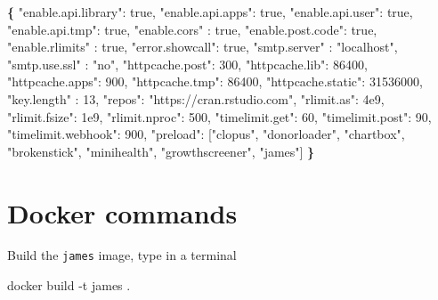 \documentclass[
]{book}
\newenvironment{Shaded}{\begin{snugshade}}{\end{snugshade}}
\newcommand{\AttributeTok}[1]{\textcolor[rgb]{0.77,0.63,0.00}{#1}}
\newcommand{\ExtensionTok}[1]{#1}
\newcommand{\KeywordTok}[1]{\textcolor[rgb]{0.13,0.29,0.53}{\textbf{#1}}}
\newcommand{\NormalTok}[1]{#1}
\newcommand{\StringTok}[1]{\textcolor[rgb]{0.31,0.60,0.02}{#1}}
\begin{document}
\begin{Shaded}
\begin{Highlighting}[]
\KeywordTok{\{}
    \StringTok{"enable.api.library"}\ExtensionTok{:}\NormalTok{ true,}
    \StringTok{"enable.api.apps"}\ExtensionTok{:}\NormalTok{ true,}
    \StringTok{"enable.api.user"}\ExtensionTok{:}\NormalTok{ true,}
    \StringTok{"enable.api.tmp"}\ExtensionTok{:}\NormalTok{ true,}
    \StringTok{"enable.cors"}\NormalTok{ : true,}
    \StringTok{"enable.post.code"}\ExtensionTok{:}\NormalTok{ true,}
    \StringTok{"enable.rlimits"}\NormalTok{ : true,}
    \StringTok{"error.showcall"}\ExtensionTok{:}\NormalTok{ true,}
    \StringTok{"smtp.server"}\NormalTok{ : }\StringTok{"localhost"}\NormalTok{,}
    \StringTok{"smtp.use.ssl"}\NormalTok{ : }\StringTok{"no"}\NormalTok{,}
    \StringTok{"httpcache.post"}\ExtensionTok{:}\NormalTok{ 300,}
    \StringTok{"httpcache.lib"}\ExtensionTok{:}\NormalTok{ 86400,}
    \StringTok{"httpcache.apps"}\ExtensionTok{:}\NormalTok{ 900,}
    \StringTok{"httpcache.tmp"}\ExtensionTok{:}\NormalTok{ 86400,}
    \StringTok{"httpcache.static"}\ExtensionTok{:}\NormalTok{ 31536000,}
    \StringTok{"key.length"}\NormalTok{ : 13,}
    \StringTok{"repos"}\ExtensionTok{:} \StringTok{"https://cran.rstudio.com"}\NormalTok{,}
    \StringTok{"rlimit.as"}\ExtensionTok{:}\NormalTok{ 4e9,}
    \StringTok{"rlimit.fsize"}\ExtensionTok{:}\NormalTok{ 1e9,}
    \StringTok{"rlimit.nproc"}\ExtensionTok{:}\NormalTok{ 500,}
    \StringTok{"timelimit.get"}\ExtensionTok{:}\NormalTok{ 60,}
    \StringTok{"timelimit.post"}\ExtensionTok{:}\NormalTok{ 90,}
    \StringTok{"timelimit.webhook"}\ExtensionTok{:}\NormalTok{ 900,}
    \StringTok{"preload"}\ExtensionTok{:}\NormalTok{ [}\StringTok{"clopus"}\NormalTok{, }\StringTok{"donorloader"}\NormalTok{, }\StringTok{"chartbox"}\NormalTok{, }\StringTok{"brokenstick"}\NormalTok{, }\StringTok{"minihealth"}\NormalTok{, }\StringTok{"growthscreener"}\NormalTok{, }\StringTok{"james"}\NormalTok{]}
\KeywordTok{\}}
\end{Highlighting}
\end{Shaded}

\hypertarget{docker-commands}{%
\section{Docker commands}\label{docker-commands}}

Build the \texttt{james} image, type in a terminal

\begin{Shaded}
\begin{Highlighting}[]
\ExtensionTok{docker}\NormalTok{ build }\AttributeTok{{-}t}\NormalTok{ james .}
\end{Highlighting}
\end{Shaded}
\end{document}
